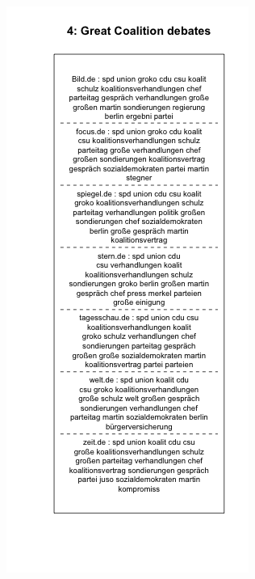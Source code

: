 \documentclass[12pt,a4paper,notitlepage]{article}
\begin{document}
\begin{figure}[H]
	\begin{center}
		\begin{subfigure}[normla]{0.49\textwidth}
			\includegraphics[width=\textwidth]{../figs/plotquote4.png}

\end{subfigure}
\end{center}
\end{figure}
\end{document}
